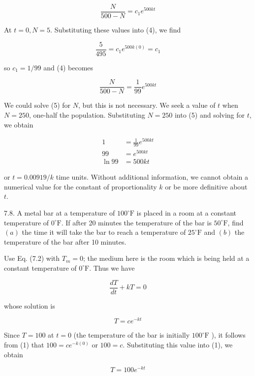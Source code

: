 \documentclass[10pt]{article}
\begin{document}
\begin{equation*}
\frac{N}{500-N}=c_{1} e^{500 k t} \tag{4}
\end{equation*}


At $t=0, N=5$. Substituting these values into (4), we find

$$
\frac{5}{495}=c_{1} e^{500 k(0)}=c_{1}
$$

so $c_{1}=1 / 99$ and (4) becomes


\begin{equation*}
\frac{N}{500-N}=\frac{1}{99} e^{500 k t} \tag{5}
\end{equation*}


We could solve (5) for $N$, but this is not necessary. We seek a value of $t$ when $N=250$, one-half the population. Substituting $N=250$ into (5) and solving for $t$, we obtain

$$
\begin{aligned}
1 & =\frac{1}{99} e^{500 k t} \\
99 & =e^{500 k t} \\
\ln 99 & =500 k t
\end{aligned}
$$

or $t=0.00919 / k$ time units. Without additional information, we cannot obtain a numerical value for the constant of proportionality $k$ or be more definitive about $t$.

7.8. A metal bar at a temperature of $100^{\circ} \mathrm{F}$ is placed in a room at a constant temperature of $0^{\circ} \mathrm{F}$. If after 20 minutes the temperature of the bar is $50^{\circ} \mathrm{F}$, find $(a)$ the time it will take the bar to reach a temperature of $25^{\circ} \mathrm{F}$ and $(b)$ the temperature of the bar after 10 minutes.

Use Eq. (7.2) with $T_{m}=0$; the medium here is the room which is being held at a constant temperature of $0^{\circ} \mathrm{F}$. Thus we have

$$
\frac{d T}{d t}+k T=0
$$

whose solution is


\begin{equation*}
T=c e^{-k t} \tag{1}
\end{equation*}


Since $T=100$ at $t=0$ (the temperature of the bar is initially $100^{\circ} \mathrm{F}$ ), it follows from (1) that $100=c e^{-k(0)}$ or $100=c$. Substituting this value into (1), we obtain


\begin{equation*}
T=100 e^{-k t} \tag{2}
\end{equation*}
\end{document}
